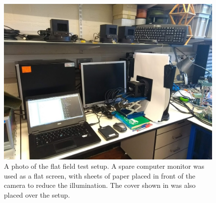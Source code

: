 \begin{colsection}
\begin{figure}[p]
    \begin{center}
        \includegraphics[width=0.75\linewidth]{images/flat_photo.jpg}
    \end{center}
    \caption[The flat field test setup]{
        A photo of the flat field test setup. A spare computer monitor was used as a flat screen, with sheets of paper placed in front of the camera to reduce the illumination. The cover shown in  was also placed over the setup.
    }\label{fig:flat_photo}
\end{figure}

\clearpage
\newpage

\end{colsection}


